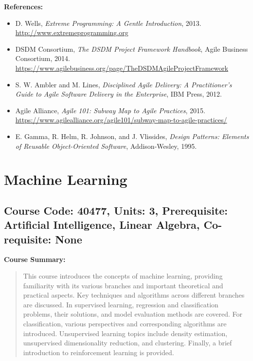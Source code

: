 \documentclass[12pt]{article}
\begin{document}
\textbf{References:}
\begin{itemize}
    \item D. Wells, \textit{Extreme Programming: A Gentle Introduction}, 2013. \url{http://www.extremeprogramming.org}
    \item DSDM Consortium, \textit{The DSDM Project Framework Handbook}, Agile Business Consortium, 2014. \url{https://www.agilebusiness.org/page/TheDSDMAgileProjectFramework}
    \item S. W. Ambler and M. Lines, \textit{Disciplined Agile Delivery: A Practitioner's Guide to Agile Software Delivery in the Enterprise}, IBM Press, 2012.
    \item Agile Alliance, \textit{Agile 101: Subway Map to Agile Practices}, 2015. \url{https://www.agilealliance.org/agile101/subway-map-to-agile-practices/}
    \item E. Gamma, R. Helm, R. Johnson, and J. Vlissides, \textit{Design Patterns: Elements of Reusable Object-Oriented Software}, Addison-Wesley, 1995.
\end{itemize}

\newpage

\section{Machine Learning}
\subsection*{Course Code: 40477, Units: 3, Prerequisite: Artificial Intelligence, Linear Algebra, Co-requisite: None}

\textbf{Course Summary:} 
\begin{quote}
   This course introduces the concepts of machine learning, providing familiarity with its various branches and important theoretical and practical aspects. Key techniques and algorithms across different branches are discussed. In supervised learning, regression and classification problems, their solutions, and model evaluation methods are covered. For classification, various perspectives and corresponding algorithms are introduced. Unsupervised learning topics include density estimation, unsupervised dimensionality reduction, and clustering. Finally, a brief introduction to reinforcement learning is provided.
\end{quote}
\end{document}
